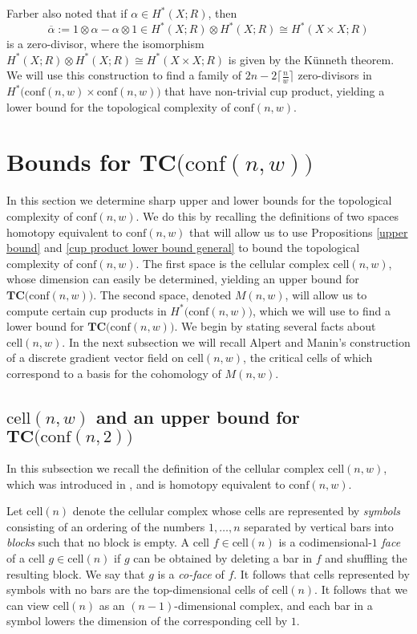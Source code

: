 Farber also noted that if $\alpha\in H^{*}(X;R)$, then
\[
\overline{\alpha}:=1\otimes \alpha-\alpha\otimes 1\in H^{*}(X;R)\otimes H^{*}(X;R)\cong H^{*}(X\times X;R)
\]
is a zero-divisor, where the isomorphism $H^{*}(X;R)\otimes H^{*}(X;R)\cong H^{*}(X\times X;R)$ is given by the K\"{u}nneth theorem.
We will use this construction to find a family of $2n-2\big\lceil\frac{n}{w}\big\rceil$ zero-divisors in $H^{*}\big(\text{conf}(n,w)\times \text{conf}(n,w)\big)$ that have non-trivial cup product, yielding a lower bound for the topological complexity of $\text{conf}(n,w)$.

\section{Bounds for $\textbf{TC}\big(\text{conf}(n,w)\big)$}
In this section we determine sharp upper and lower bounds for the topological complexity of $\text{conf}(n,w)$.
We do this by recalling the definitions of two spaces homotopy equivalent to $\text{conf}(n,w)$ that will allow us to use Propositions \ref{upper bound} and \ref{cup product lower bound general} to bound the topological complexity of $\text{conf}(n,w)$.
The first space is the cellular complex $\text{cell}(n,w)$, whose dimension can easily be determined, yielding an upper bound for $\textbf{TC}\big(\text{conf}(n,w)\big)$.
The second space, denoted $M(n,w)$, will allow us to compute certain cup products in $H^{*}\big(\text{conf}(n,w)\big)$, which we will use to find a lower bound for  $\textbf{TC}\big(\text{conf}(n,w)\big)$.
We begin by stating several facts about $\text{cell}(n,w)$.
In the next subsection we will recall Alpert and Manin's construction of a discrete gradient vector field on $\text{cell}(n,w)$, the critical cells of which correspond to a basis for the cohomology of $M(n,w)$.

\subsection{$\text{cell}(n,w)$ and an upper bound for $\textbf{TC}\big(\text{conf}(n,2)\big)$}

In this subsection we recall the definition of the cellular complex $\text{cell}(n,w)$,  which was introduced in \cite{blagojevic2014convex}, and is homotopy equivalent to $\text{conf}(n,w)$.

Let \emph{$\text{cell}(n)$} denote the cellular complex whose cells are represented by \emph{symbols} consisting of an ordering of the numbers $1, \dots, n$ separated by vertical bars into \emph{blocks} such that no block is empty. 
A cell $f\in \text{cell}(n)$ is a codimensional-$1$ \emph{face} of a cell $g\in \text{cell}(n)$ if $g$ can be obtained by deleting a bar in $f$ and shuffling the resulting block.
We say that $g$ is a \emph{co-face} of $f$.
It follows that cells represented by symbols with no bars are the top-dimensional cells of $\text{cell}(n)$.
It follows that we can view $\text{cell}(n)$ as an $(n-1)$-dimensional complex, and each bar in a symbol lowers the dimension of the corresponding cell by $1$.

